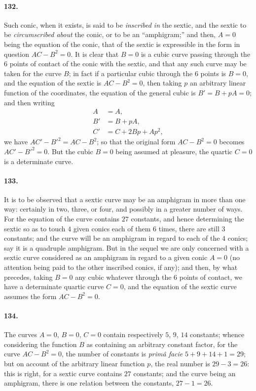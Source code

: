 \documentclass[11pt,a4paper]{article}
\begin{document}
\paragraph{132.}
Such conic, when it exists, is said to be \textit{inscribed in} the
sextic, and the sextic to be \textit{circumscribed about} the conic, or
to be an ``amphigram;'' and then, $A = 0$ being the equation of the conic,
that of the sextic is expressible in the form in question $AC - B^2 = 0$.
It is clear that $B = 0$ is a cubic curve passing through the $6$ points
of contact of the conic with the sextic, and that any such curve may be
taken for the curve $B$; in fact if a particular cubic through the $6$
points is $B = 0$, and the equation of the sextic is $AC - B^2 = 0$, then
taking $p$ an arbitrary linear function of the coordinates, the equation
of the general cubic is $B' = B + pA = 0$; and then writing
\[
\begin{aligned}
A &= A, \\
B' &= B + pA, \\
C' &= C + 2 Bp + Ap^2,
\end{aligned}
\]
we have $AC' - B'^2 = AC - B^2$; so that the original form $AC - B^2 = 0$
becomes $AC' - B'^2 = 0$. But the cubic $B = 0$ being assumed at pleasure,
the quartic $C = 0$ is a determinate curve.

\paragraph{133.}
It is to be observed that a sextic curve may be an amphigram in more than
one way: certainly in two, three, or four, and possibly in a greater
number of ways. For the equation of the curve contains $27$ constants,
and hence determining the sextic so as to touch $4$ given conics each of
them $6$ times, there are still $3$ constants; and the curve will be an
amphigram in regard to each of the $4$ conics; say it is a quadruple
amphigram. But in the sequel we are only concerned with a sextic curve
considered as an amphigram in regard to a given conic $A = 0$ (no
attention being paid to the other inscribed conics, if any); and then, by
what precedes, taking $B = 0$ any cubic whatever through the $6$ points
of contact, we have a determinate quartic curve $C = 0$, and the equation
of the sextic curve assumes the form $AC - B^2 = 0$.

\paragraph{134.}
The curves $A = 0$, $B = 0$, $C = 0$ contain respectively $5$, $9$, $14$
constants; whence considering the function $B$ as containing an arbitrary
constant factor, for the curve $AC - B^2 = 0$, the number of constants is
\textit{prim\^a facie} $5 + 9 + 14 + 1 = 29$; but on account of the
arbitrary linear function $p$, the real number is $29 - 3 = 26$: this is
right, for a sextic curve contains $27$ constants; and the curve being an
amphigram, there is one relation between the constants, $27 - 1 = 26$.
\end{document}
